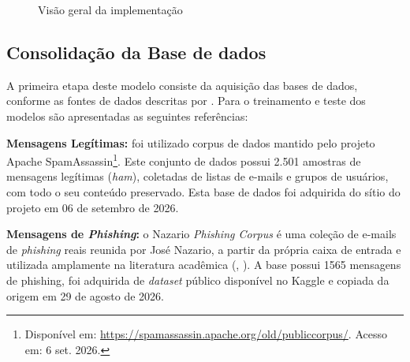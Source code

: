 \documentclass[12pt]{article}
\begin{document}
\begin{figure}[ht]
{%
    }
    
    \caption{Visão geral da implementação}
    \label{fig:visao_geral}
\end{figure}





\subsection{Consolidação da Base de dados} \label{sub:db_cons}

            A primeira etapa deste modelo consiste da aquisição das bases de dados, conforme as fontes de dados descritas por  \cite{bispo2025philder} . Para o treinamento e teste  dos modelos são apresentadas as seguintes referências:
        
\textbf{Mensagens Legítimas:} foi utilizado corpus de dados mantido pelo projeto Apache SpamAssassin\footnote{Disponível em: \url{https://spamassassin.apache.org/old/publiccorpus/}. Acesso em: 6 set. 2026.}. Este conjunto de dados possui 2.501 amostras de mensagens legítimas (\textit{ham}), coletadas de listas de e-mails e grupos de usuários, com todo o seu conteúdo preservado. Esta base de dados foi adquirida do sítio do projeto em 06 de setembro de 2026.

 \textbf{Mensagens de \textit{Phishing}:} o Nazario \textit{Phishing Corpus} é uma coleção de e-mails de \textit{phishing} reais reunida por José Nazario, a partir da própria caixa de entrada e utilizada amplamente na literatura acadêmica (\cite{gualberto2020feature},  \cite{alsubaiey2024novel}). A base possui 1565 mensagens de phishing, foi adquirida de \textit{dataset} público disponível no Kaggle e copiada da origem em 29 de agosto de 2026.
\end{document}

